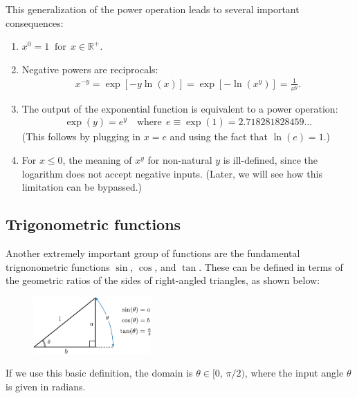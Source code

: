 \documentclass[10pt,a4paper]{article}
\begin{document}
This generalization of the power operation leads to several important
consequences:
\begin{enumerate}
\item $\displaystyle x^0 = 1 \;\;\mathrm{for}\;\, x \in \mathbb{R}^+.$

\item Negative powers are reciprocals:
  \begin{align}
    x^{-y} = \exp[-y\ln(x)] = \exp[-\ln(x^y)] = \frac{1}{x^y}.
  \end{align}

\item The output of the exponential function is equivalent to a power
  operation:
  \begin{align}
    \displaystyle\exp(y) = e^y\quad\mathrm{where}\;\, e \equiv \exp(1) = 2.718281828459\!\dots
  \end{align}
  (This follows by plugging in $x=e$ and using the fact that $\ln(e) = 1$.)

\item For $x \le 0$, the meaning of $x^y$ for non-natural $y$ is
  ill-defined, since the logarithm does not accept negative
  inputs. (Later, we will see how this limitation can be bypassed.)
\end{enumerate}

\subsection{Trigonometric functions}
\label{trigonometric-functions}

Another extremely important group of functions are the fundamental
trignonometric functions $\sin$, $\cos$, and $\tan$.  These can be
defined in terms of the geometric ratios of the sides of right-angled
triangles, as shown below:

\begin{figure}[h!]
  \centering\includegraphics[width=0.4\textwidth]{trigonometry}
\end{figure}

\clearpage

\noindent
If we use this basic definition, the domain is $\theta \in [0,
  \,\pi/2)$, where the input angle $\theta$ is given in radians.
\end{document}
